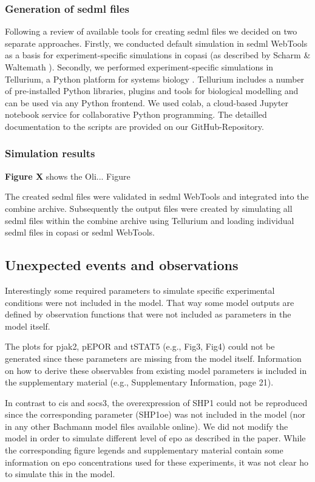 \subsubsection*{Generation of \acs{sedml} files}

Following a review of available tools for creating \ac{sedml} files \cite{sedmltool} we decided on two separate approaches. Firstly, we conducted default simulation in \ac{sedml} WebTools as a basis for experiment-specific simulations in \ac{copasi} (as described by Scharm \& Waltemath \cite{combine}). Secondly, we performed experiment-specific simulations in Tellurium, a Python platform for systems biology \cite{tellurium}. Tellurium includes a number of pre-installed Python libraries, plugins and tools for biological modelling and can be used via any Python frontend. We used \ac{colab}, a cloud-based Jupyter notebook service for collaborative Python programming. The detailled documentation to the scripts are provided on our GitHub-Repository.

\subsubsection*{Simulation results}
\textbf{Figure X} shows the {\Huge Oli... Figure}

The created \ac{sedml} files were validated in \ac{sedml} WebTools and integrated into the \ac{combine} archive. Subsequently the output files were created by simulating all \ac{sedml} files within the \ac{combine} archive using Tellurium and loading individual \ac{sedml} files in \ac{copasi} or \ac{sedml} WebTools. 


\subsection*{Unexpected events and observations}
Interestingly some required parameters to simulate specific experimental conditions were not included in the model. That way some model outputs are defined by observation functions that were not included as parameters in the model itself. 

The plots for p\ac{jak}2, pEPOR and tSTAT5 (e.g., Fig3, Fig4) could not be generated since these parameters are missing from the model itself. Information on how to derive these observables from existing model parameters is included in the supplementary material (e.g., Supplementary Information, page 21). 

In contrast to \ac{cis} and \ac{socs}3, the overexpression of SHP1 could not be reproduced since the corresponding parameter (SHP1oe) was not included in the model (nor in any other Bachmann model files available online). We did not modify the model in order to simulate different level of \ac{epo} as described in the paper. While the corresponding figure legends and supplementary material contain some information on \ac{epo} concentrations used for these experiments, it was not clear ho to simulate this in the model.

